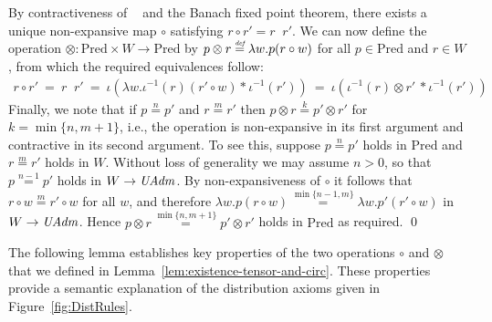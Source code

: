 \documentclass{LMCS}
\theoremstyle{remark}
\newcommand{\defeq}{\ensuremath{\stackrel{\mbox{\tiny \it def}}{=}}}
\newcommand{\Pred}{\ensuremath{\mathrm{Pred}}\xspace}
\newcommand{\W}{\ensuremath{W}}
\newcommand{\FOLD}{\ensuremath{\iota}}
\newcommand{\UNFOLD}{\ensuremath{\iota^{-1}}}
\newcommand{\nequiv}[1]{\ensuremath{\mathrel{\stackrel{#1}{=}}}}
\newcommand{\PHI}[1]{\ensuremath{\mathop{\overline{#1}}}}
\begin{document}
By contractiveness of $\PHI\cdot$ and the Banach fixed point theorem, there exists a unique non-expansive map $\circ$ satisfying $r\circ r' = r\PHI\circ r'$. 
We can now define the operation $\otimes : \Pred\times W\to\Pred$ by 
$p\otimes r \defeq \lambda w. p(r\circ w)$ for all $p\in\Pred$ and $r\in\W$, from which the required equivalences follow: 
\begin{align*}
r\circ r'\  =\ r\PHI\circ r'
\ =\ \FOLD(\lambda w.\UNFOLD(r)(r'\circ w) * \UNFOLD(r'))
\ =\ \FOLD(\UNFOLD(r)\otimes r'\, * \UNFOLD(r'))
\end{align*}
Finally, we note that if $p\nequiv n p'$ and $r\nequiv m r'$ then $p\otimes r\nequiv k p'\otimes r'$ for $k = \min\{n,m+1\}$, i.e., the operation is non-expansive in its first argument and contractive in its second argument. To see this, suppose $p\nequiv n p'$ holds in $\Pred$ and $r\nequiv m r'$ holds in $\W$. Without loss of generality we may assume $n>0$, so that $p\nequiv {n-1} p'$ holds in $\W\to\UAdm$. By non-expansiveness of $\circ$ it follows that $r\circ w \nequiv m r'\circ w$ for all $w$, and therefore 
$\lambda w.p(r\circ w)\nequiv{\min\{n{-}1,m\}}\lambda w.p'(r'\circ w)$ in $\W\to\UAdm$. 
Hence $p\otimes r\nequiv{\min\{n,m{+}1\}} p'\otimes r'$ holds in $\Pred$ as required. \qed


The following lemma establishes key properties of the two operations $\circ$ and $\otimes$ that we defined in Lemma~\ref{lem:existence-tensor-and-circ}. These properties provide a semantic explanation of the distribution axioms given in Figure~\ref{fig:DistRules}. 
  
\end{document}
